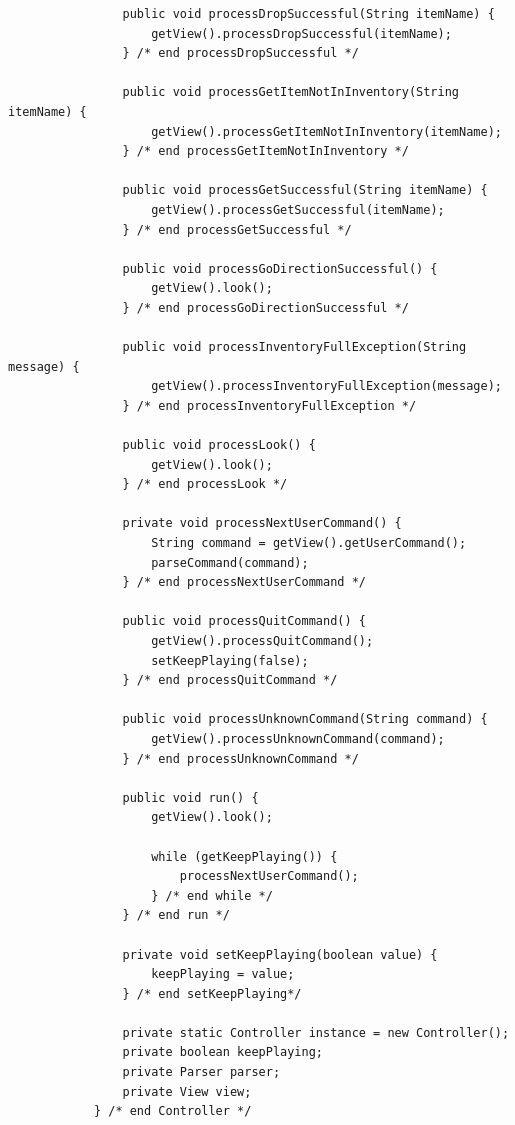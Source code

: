 \documentclass[a4paper, 11pt]{article}
\begin{document}
\begin{lstlisting}
                public void processDropSuccessful(String itemName) {
                    getView().processDropSuccessful(itemName);
                } /* end processDropSuccessful */

                public void processGetItemNotInInventory(String itemName) {
                    getView().processGetItemNotInInventory(itemName);
                } /* end processGetItemNotInInventory */

                public void processGetSuccessful(String itemName) {
                    getView().processGetSuccessful(itemName);
                } /* end processGetSuccessful */

                public void processGoDirectionSuccessful() {
                    getView().look();
                } /* end processGoDirectionSuccessful */

                public void processInventoryFullException(String message) {
                    getView().processInventoryFullException(message);
                } /* end processInventoryFullException */

                public void processLook() {
                    getView().look();
                } /* end processLook */

                private void processNextUserCommand() {
                    String command = getView().getUserCommand();
                    parseCommand(command);
                } /* end processNextUserCommand */

                public void processQuitCommand() {
                    getView().processQuitCommand();
                    setKeepPlaying(false);
                } /* end processQuitCommand */

                public void processUnknownCommand(String command) {
                    getView().processUnknownCommand(command);
                } /* end processUnknownCommand */

                public void run() {
                    getView().look();

                    while (getKeepPlaying()) {
                        processNextUserCommand();
                    } /* end while */
                } /* end run */

                private void setKeepPlaying(boolean value) {
                    keepPlaying = value;
                } /* end setKeepPlaying*/

                private static Controller instance = new Controller();
                private boolean keepPlaying;
                private Parser parser;
                private View view;
            } /* end Controller */



\end{lstlisting}
\end{document}
